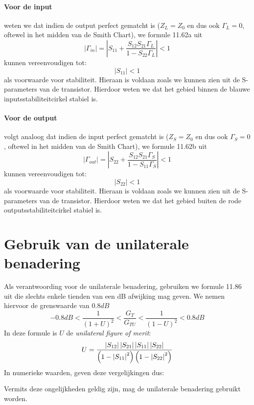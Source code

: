     \paragraph{Voor de input} weten we dat indien de output perfect gematcht is
    ($Z_L = Z_0$ en dus ook $\Gamma_L = 0$, oftewel in het midden van de Smith
    Chart), we formule 11.62a uit \cite{Pozar}
    \[
      \left| \Gamma_{in} \right| = \left| S_{11} + \frac{S_{12}S_{21}\Gamma_L}{1 - S_{22}\Gamma_L} \right| < 1
    \]
    kunnen vereenvoudigen tot:
    \[
      \left| S_{11} \right|  < 1
    \]
    als voorwaarde voor stabiliteit. Hieraan is voldaan zoals we kunnen zien uit
    de S-parameters van de transistor. Hierdoor weten we dat het gebied binnen
    de blauwe inputsstabiliteitcirkel stabiel is.
    
    \paragraph{Voor de output} volgt analoog dat indien de input perfect
    gematcht is ($Z_S = Z_0$ en dus ook $\Gamma_S = 0$, oftewel in het
    midden van de Smith Chart), we formule 11.62b uit \cite{Pozar}
    \[
      \left| \Gamma_{out} \right| = \left| S_{22} + \frac{S_{12}S_{21}\Gamma_S}{1 - S_{11}\Gamma_S} \right| < 1
    \]
    kunnen vereenvoudigen tot:
    \[
      \left| S_{22} \right|  < 1
    \]
    als voorwaarde voor stabiliteit. Hieraan is voldaan zoals we kunnen zien uit
    de S-parameters van de transistor. Hierdoor weten we dat het gebied buiten
    de rode outputsstabiliteitcirkel stabiel is.
    

\section{Gebruik van de unilaterale benadering}
  Als verantwoording voor de unilaterale benadering, gebruiken we formule 11.86
  uit \cite{Pozar} die slechts enkele tienden van een dB afwijking mag geven.
  We nemen hiervoor de grenswaarde van $0.8 dB$
  \[
    -0.8 dB < \frac{1}{\left( 1 + U\right)^ 2} < \frac{G_T}{G_{TU}} < \frac{1}{\left( 1 - U\right)^ 2} < 0.8 dB
  \]
  In deze formule is $U$ de \textit{unilateral figure of merit}:
  \[
    U = \frac{\left| S_{12} \right| \left| S_{21} \right| \left| S_{11} \right| \left| S_{22} \right|}{ \left( 1 - \left| S_{11} \right|^2 \right) \left( 1 - \left| S_{22} \right|^2 \right)}
  \]
  In numerieke waarden, geven deze vergelijkingen dus:
    
  Vermits deze ongelijkheden geldig zijn, mag de unilaterale benadering gebruikt
  worden.
  
